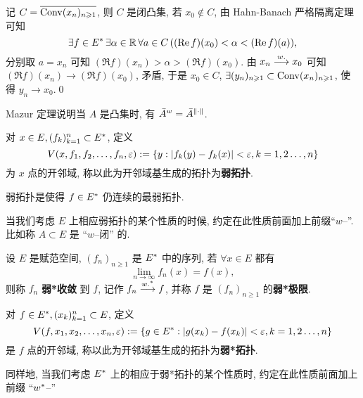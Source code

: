     \begin{Proof}
        记 $ C = \overline{\operatorname{Conv}(x_{n})_{n\geqslant1}} $, 则 $ C $ 是闭凸集, 若 $ x_{0}\notin C $, 由 Hahn-Banach 严格隔离定理可知
        \[
            \exists f\in E^{*}\,\exists\alpha\in\mathbb{R}\,\forall a\in C\,((\mathrm{Re\,} f)(x_{0})<\alpha<(\mathrm{Re\,} f)(a)),
        \]
        分别取 $ a=x_{n} $ 可知 $ (\Re f)(x_{n})>\alpha>(\Re f)(x_{0}) $. 由 $ x_{n}\overset{w.}{\longrightarrow} x_{0} $ 可知 $ (\Re f)(x_{n})\to (\Re f)(x_{0}) $, 矛盾, 于是 $ x_{0}\in C $, $ \exists (y_{n})_{n\geqslant1}\subset\operatorname{Conv}(x_{n})_{n\geqslant1} $, 使得 $ y_{n}\to x_{0} $.\qed
    \end{Proof}

    Mazur 定理说明当 $ A $ 是凸集时, 有 $ \bar{A}^{w}=\bar{A}^{\left\| \cdot \right\|} $.

    \begin{Definition}[弱拓扑]\label{def:弱拓扑}
        对 $ x\in E, (f_{k})_{k=1}^{n}\subset E^{*} $, 定义
        \[
            V(x, f_{1}, f_{2}, \dots, f_{n}, \varepsilon):=\{ y:\left| f_{k}(y)-f_{k}(x) \right| <\varepsilon, k=1, 2\dots, n \}
        \]
        为 $ x $ 点的开邻域, 称以此为开邻域基生成的拓扑为\textbf{弱拓扑}.
    \end{Definition}
    \begin{Remark}
        弱拓扑是使得 $ f\in E^{*} $ 仍连续的最弱拓扑.
    \end{Remark}
    \begin{Remark}
        当我们考虑 $ E $ 上相应弱拓扑的某个性质的时候, 约定在此性质前面加上前缀``$ w $--''. 比如称 $ A\subset E $ 是 ``$ w $--闭'' 的.
    \end{Remark}

    \begin{Definition}[弱*收敛]\label{def:弱*收敛}
        设 $ E $ 是赋范空间, $ (f_{n})_{n\geqslant1} $ 是 $ E^{*} $ 中的序列, 若 $ \forall x\in E $ 都有
        \[
            \lim_{n\to\infty}f_{n}(x)=f(x),
        \]
        则称 $ f_{n} $ \textbf{弱*收敛} 到 $ f $, 记作 $ f_{n}\overset{w.^{*}}{\longrightarrow} f $, 并称 $ f $ 是 $ (f_{n})_{n\geqslant1} $ 的\textbf{弱*极限}.
    \end{Definition}
    \begin{Definition}[弱*拓扑]\label{def:弱*拓扑}
        对 $ f\in E^{*}, (x_{k})_{k=1}^{n}\subset E $, 定义
        \[
            V(f, x_{1}, x_{2}, \dots, x_{n}, \varepsilon):=\{ g\in E^{*}:\left| g(x_{k})-f(x_{k}) \right| <\varepsilon, k=1, 2\dots, n \}
        \]
        是 $ f $ 点的开邻域, 称以此为开邻域基生成的拓扑为\textbf{弱*拓扑}.
    \end{Definition}
    \begin{Remark}
        同样地, 当我们考虑 $ E^{*} $ 上的相应于弱*拓扑的某个性质时, 约定在此性质前面加上前缀 ``$w^{*}$--''
    \end{Remark}


